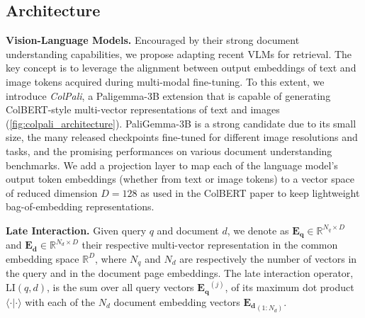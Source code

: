 \documentclass{article} %
\begin{document}



\subsection{Architecture}
\label{subsection:architecture}


\textbf{Vision-Language Models.}
Encouraged by their strong document understanding capabilities, we propose adapting recent VLMs for retrieval. The key concept is to leverage the alignment between output embeddings of text and image tokens acquired during multi-modal fine-tuning. 
To this extent, we introduce \textit{ColPali}, a Paligemma-3B extension that is capable of generating ColBERT-style multi-vector representations of text and images (\autoref{fig:colpali_architecture}).
PaliGemma-3B is a strong candidate due to its small size, the many released checkpoints fine-tuned for different image resolutions and tasks, and the promising performances on various document understanding benchmarks. 
We add a projection layer to map each of the language model's output token embeddings (whether from text or image tokens)  to a vector space of reduced dimension $D = 128$ as used in the ColBERT paper \citep{khattab_colbert_2020} to keep lightweight bag-of-embedding representations.


\noindent\textbf{Late Interaction.}
Given query $q$ and document $d$, we denote as $\mathbf{E_q} \in \mathbb{R}^{{N_q} \times D}$ and $\mathbf{E_d} \in \mathbb{R}^{N_d \times D}$ their respective multi-vector representation in the common embedding space $\mathbb{R}^D$, where $N_q$ and $N_d$ are respectively the number of vectors in the query and in the document page embeddings. The late interaction operator, $\text{LI} \left( q, d \right)$, is the sum over all query vectors $\mathbf{E_{q}}^{(j)}$, of its maximum dot product $\langle \cdot | \cdot \rangle$ with each of the $N_d$ document embedding vectors $\mathbf{E_d}_{(1:N_d)}$.
\end{document}
